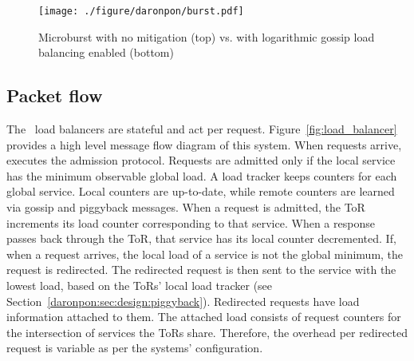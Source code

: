 


\begin{figure}[t]
  \centering
    \texttt{[image: ./figure/daronpon/burst.pdf]}
    \centering

    \caption{Microburst with no mitigation (top) vs. with
    logarithmic gossip load balancing enabled (bottom)}

  \label{fig:microburst}
\end{figure}

\subsection{Packet flow}

The \daronpon\ load balancers are stateful and act per request.
Figure~\ref{fig:load_balancer} provides a high level message flow diagram of
this system.  When requests arrive, \daronpon executes the admission
protocol. Requests are admitted only if the local service has the minimum
observable global load. A load tracker keeps counters for each global service.
Local counters are up-to-date, while remote counters are learned via gossip and
piggyback messages.  When a request is admitted, the ToR increments its load
counter corresponding to that service.  When a response passes back through the
ToR, that service has its local counter decremented.  If, when a request
arrives, the local load of a service is not the global minimum, the request is
redirected. The redirected request is then sent to the service with the lowest
load, based on the ToRs' local load tracker (see
Section~\ref{daronpon:sec:design:piggyback}).  Redirected requests have load information
attached to them. The attached load consists of request counters for the
intersection of services the ToRs share.  Therefore, the overhead per
redirected request is variable as per the systems' configuration.

